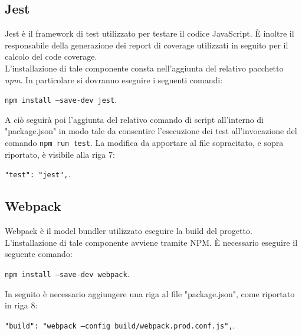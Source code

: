 \subsection{Jest}\label{jest}
Jest è il framework di test utilizzato per testare il codice JavaScript. È inoltre il responsabile della generazione dei report di coverage utilizzati in seguito per il calcolo del code coverage.\\
L'installazione di tale componente consta nell'aggiunta del relativo pacchetto \textit{npm}. In particolare si dovranno eseguire i seguenti comandi:
\begin{center}
\texttt{npm install --save-dev jest}.
\end{center}
A ciò seguirà poi l'aggiunta del relativo comando di script all'interno di "package.json" in modo tale da consentire l'esecuzione dei test all'invocazione del comando \texttt{npm run test}. La modifica da apportare al file sopracitato, e sopra riportato, è visibile alla riga 7:
\begin{center}
	\texttt{"test": "jest",}.
\end{center}

\subsection{Webpack}\label{webpack}
Webpack è il model bundler utilizzato eseguire la build del progetto.\\
L'installazione di tale componente avviene tramite NPM. È necessario eseguire il seguente comando:
\begin{center}
	\texttt{npm install --save-dev webpack}.
\end{center}
In seguito è necessario aggiungere una riga al file "package.json", come riportato in riga 8:
\begin{center}
	\texttt{"build": "webpack --config build/webpack.prod.conf.js",}.
\end{center}


